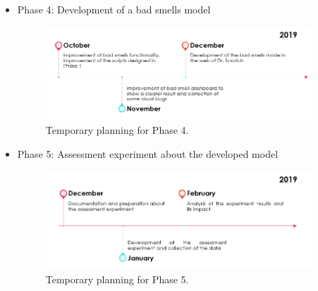 \begin{itemize}
    \item Phase 4: Development of a bad smells model 
    
    \begin{figure}[h]
    \centering
        \includegraphics[width=10cm, keepaspectratio]{img/phase_4.png}
        \caption{Temporary planning for Phase 4.}
        \label{fig:phase_4}
    \end{figure}
    
    \item Phase 5: Assessment experiment about the developed model
    
    \begin{figure}[h]
    \centering
        \includegraphics[width=10cm, keepaspectratio]{img/phase_5.png}
        \caption{Temporary planning for Phase 5.}
        \label{fig:phase_5}
    \end{figure}
    
\end{itemize}
